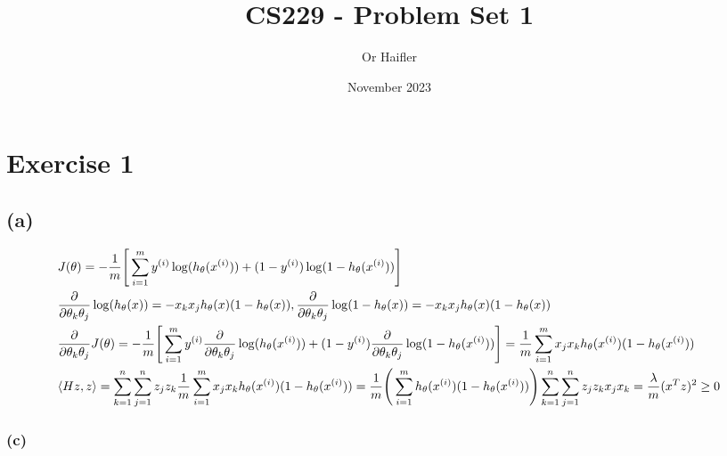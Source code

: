 \documentclass{article}
\title{CS229 - Problem Set 1}
\author{Or Haifler}
\date{November 2023}
\begin{document}
\maketitle

\section*{Exercise 1}
\subsection*{(a)}
\begin{align*}
    & J(\theta)=-\frac{1}{m}\Bigg{[}\sum_{i=1}^{m}y^{(i)}\log(h_{\theta}(x^{(i)}))+(1-y^{(i)})\log(1-h_{\theta}(x^{(i)}))\Bigg{]}                                                                                                                                                                                                                        \\
    & \frac{\partial}{\partial\theta_{k}\theta_{j}}\log(h_{\theta}(x))=-x_{k}x_{j}h_{\theta}(x)(1-h_{\theta}(x)), \frac{\partial}{\partial\theta_{k}\theta_{j}}\log(1-h_{\theta}(x))=-x_{k}x_{j}h_{\theta}(x)(1-h_{\theta}(x))                                                                                                                           \\
    & \frac{\partial}{\partial\theta_{k}\theta_{j}}J(\theta)=-\frac{1}{m}\Bigg{[}\sum_{i=1}^{m}y^{(i)}\frac{\partial}{\partial\theta_{k}\theta_{j}}\log(h_{\theta}(x^{(i)}))+(1-y^{(i)})\frac{\partial}{\partial\theta_{k}\theta_{j}}\log(1-h_{\theta}(x^{(i)}))\Bigg{]} = \frac{1}{m}\sum_{i=1}^{m}x_{j}x_{k}h_{\theta}(x^{(i)})(1-h_{\theta}(x^{(i)})) \\
    & \langle Hz,z \rangle = \sum_{k=1}^{n}\sum_{j=1}^{n}z_{j}z_{k}\frac{1}{m}\sum_{i=1}^{m}x_{j}x_{k}h_{\theta}(x^{(i)})(1-h_{\theta}(x^{(i)}))=\frac{1}{m}\Bigg{(}\sum_{i=1}^{m}h_{\theta}(x^{(i)})(1-h_{\theta}(x^{(i)}))\Bigg{)}\sum_{k=1}^{n}\sum_{j=1}^{n}z_{j}z_{k}x_{j}x_{k} = \frac{\lambda}{m}(x^{T}z)^2 \ge 0
\end{align*}


\subsubsection*{(c)}
\end{document}
